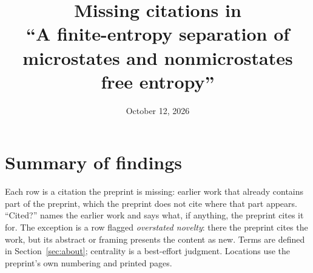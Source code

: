\documentclass[11pt]{article}
\title{Missing citations in\\ ``A finite-entropy separation of microstates and nonmicrostates free entropy''}
\date{October 12, 2026}
\newcounter{finding}
\begin{document}
\maketitle

\section*{Summary of findings}

Each row is a citation the preprint is missing: earlier work that already
contains part of the preprint, which the preprint does not cite where that
part appears. ``Cited?'' names the earlier work and says what, if anything, the
preprint cites it for. The exception is a row flagged \emph{overstated
novelty}: there the preprint cites the work, but its abstract or framing
presents the content as new. Terms are defined in Section~\ref{sec:about};
centrality is a best-effort judgment. Locations use the preprint's own
numbering and printed pages.
\end{document}
